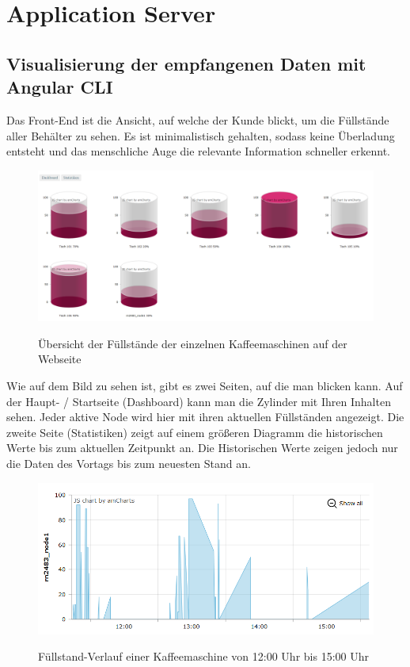 \chapter{Application Server}
\section{Visualisierung der empfangenen Daten mit Angular CLI}
Das Front-End ist die Ansicht, auf welche der Kunde blickt, um die Füllstände aller Behälter zu sehen. Es ist minimalistisch gehalten, sodass keine Überladung entsteht und das menschliche Auge die relevante Information schneller erkennt. \\
\begin{figure}[ht]
    \center
    \includegraphics[width=16cm]{Bilder/front-end-1.png}\\
    \caption{Übersicht der Füllstände der einzelnen Kaffeemaschinen auf der Webseite}
\end{figure}

Wie auf dem Bild zu sehen ist, gibt es zwei Seiten, auf die man blicken kann. Auf der Haupt- / Startseite (Dashboard) kann man die Zylinder mit Ihren Inhalten sehen. Jeder aktive Node wird hier mit ihren aktuellen Füllständen angezeigt. Die zweite Seite (Statistiken) zeigt auf einem größeren Diagramm die historischen Werte bis zum aktuellen Zeitpunkt an. Die Historischen Werte zeigen jedoch nur die Daten des Vortags bis zum neuesten Stand an. 
\begin{figure}[H]
    \center
    \includegraphics[width=16cm]{Bilder/front-end-2.png}\\
    \caption{Füllstand-Verlauf einer Kaffeemaschine von 12:00 Uhr bis 15:00 Uhr}
\end{figure}

